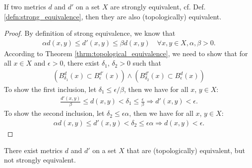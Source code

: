 \begin{theorem}
	If two metrics $d$ and $d'$ on a set $X$ are strongly equivalent, cf. Def. \ref{defn:strong_equivalence}, then they are also (topologically) equivalent.
\end{theorem}

\begin{proof}\cite{1379634}
	By definition of strong equivalence, we know that 
	\begin{align}
		\alpha d(x, y) \leq d'(x, y) \leq \beta d(x, y) \quad\forall x, y\in X, \alpha, \beta > 0.
	\end{align}
	According to Theorem \ref{thrm:topological_equivalence}, we need to show that for all $x\in X$ and $\epsilon > 0$, there exist $\delta_1$, $\delta_2 > 0$ such that 
	\begin{align}
		\left(B_{\delta_1}^{d}(x) \subset B_{\epsilon}^{d'}(x)\right) \wedge \left(B^{d'}_{\delta_2}(x) \subset B^{d}_{\epsilon}(x)\right)
	\end{align}
	To show the first inclusion, let $\delta_1 \leq \epsilon/\beta$, then we have for all $x$, $y\in X$:
	\begin{align}
		\frac{d'(x, y)}{\beta} \leq d(x, y) < \delta_1 \leq \frac{\epsilon}{\beta} \Rightarrow d'(x, y) < \epsilon.
	\end{align}
	To show the second inclusion, let $\delta_2 \leq \epsilon\alpha$, then we have for all $x$, $y\in X$:
	\begin{align}
		\alpha d(x, y)\leq d'(x, y) < \delta_2 \leq \epsilon\alpha \Rightarrow d(x, y) < \epsilon.
	\end{align}
\end{proof}

\begin{remark}
	There exist metrics $d$ and $d'$ on a set $X$ that are (topologically) equivalent, but not strongly equivalent. \cite{5065146}
\end{remark}

